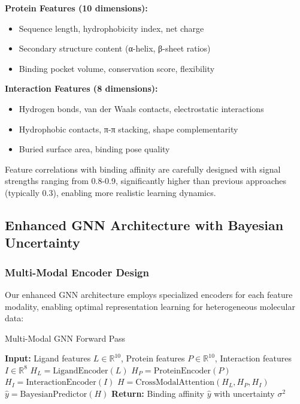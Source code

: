 \documentclass[11pt,a4paper]{article}
\begin{document}
\textbf{Protein Features (10 dimensions):}
\begin{itemize}
    \item Sequence length, hydrophobicity index, net charge
    \item Secondary structure content (α-helix, β-sheet ratios)
    \item Binding pocket volume, conservation score, flexibility
\end{itemize}

\textbf{Interaction Features (8 dimensions):}
\begin{itemize}
    \item Hydrogen bonds, van der Waals contacts, electrostatic interactions
    \item Hydrophobic contacts, π-π stacking, shape complementarity
    \item Buried surface area, binding pose quality
\end{itemize}

Feature correlations with binding affinity are carefully designed with signal strengths ranging from 0.8-0.9, significantly higher than previous approaches (typically 0.3), enabling more realistic learning dynamics.

\subsection{Enhanced GNN Architecture with Bayesian Uncertainty}

\subsubsection{Multi-Modal Encoder Design}

Our enhanced GNN architecture employs specialized encoders for each feature modality, enabling optimal representation learning for heterogeneous molecular data:

\begin{algorithm}[H]
\caption{Multi-Modal GNN Forward Pass}
\begin{algorithmic}[1]
\State \textbf{Input:} Ligand features $L \in \mathbb{R}^{10}$, Protein features $P \in \mathbb{R}^{10}$, Interaction features $I \in \mathbb{R}^{8}$
\State $H_L = \text{LigandEncoder}(L)$ 
\State $H_P = \text{ProteinEncoder}(P)$ 
\State $H_I = \text{InteractionEncoder}(I)$ 
\State $H = \text{CrossModalAttention}(H_L, H_P, H_I)$ 
\State $\hat{y} = \text{BayesianPredictor}(H)$ 
\State \textbf{Return:} Binding affinity $\hat{y}$ with uncertainty $\sigma^2$
\end{algorithmic}
\end{algorithm}
\end{document}
